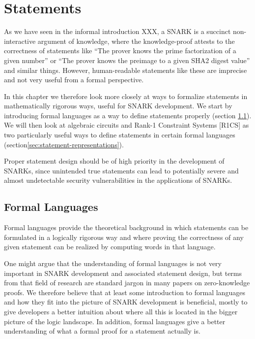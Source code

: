 \chapter{Statements}\label{sec:statements}\label{chap:statements}

As we have seen in the informal introduction XXX, a SNARK is a succinct non-interactive argument of knowledge, where the knowledge-proof attests to the correctness of statements like ``The prover knows the prime factorization of a given number'' or ``The prover knows the preimage to a given SHA2 digest value'' and similar things. However,  human-readable statements like these are imprecise and not very useful from a formal perspective. 

In this chapter we therefore look more closely at ways to formalize statements in mathematically rigorous ways, useful for SNARK development. We start by introducing formal languages as a way to define statements properly (section \ref{sec:formal-languages}). We will then look at algebraic circuits and Rank-1 Constraint Systems [R1CS] as two particularly useful ways to define statements in certain formal languages (section\ref{sec:statement-representations}). 

Proper statement design should be of high priority in the development of SNARKs, since unintended true statements can lead to potentially severe and almost undetectable security vulnerabilities in the applications of SNARKs.

\section{Formal Languages}\label{sec:formal-languages}

Formal languages provide the theoretical background in which statements can be formulated in a logically rigorous way and where proving the correctness of any given statement can be realized by computing words in that language.

One might argue that the understanding of formal languages is not very important in SNARK development and associated statement design, but terms from that field of research are standard jargon in many papers on zero-knowledge proofs. We therefore believe that at least some introduction to formal languages and how they fit into the picture of SNARK development is beneficial, mostly to give developers a better intuition about where all this is located in the bigger picture of the logic landscape. In addition, formal languages give a better understanding of what a formal proof for a statement actually is.

